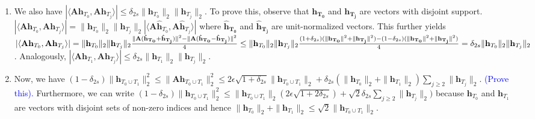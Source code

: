 \documentclass[11pt]{article}
\begin{document}
\begin{enumerate}
\begin{enumerate}
\begin{enumerate}
\textcolor{blue}{
The first inequality follows from the Cauchy-Schwartz inequality. The second inequality can be arrived at using the result of part a and the restricted isometry property of $\mathbf{A}$. 
}
\item We also have $|\langle \mathbf{Ah}_{T_0}, \mathbf{Ah}_{T_j}\rangle| \leq \delta_{2s} \|\mathbf{h}_{T_0}\|_2 \|\mathbf{h}_{T_j}\|_2$. To prove this, observe that $\mathbf{h_{T_0}}$ and $\mathbf{h_{T_j}}$ are vectors with disjoint support. $|\langle \mathbf{Ah}_{T_0}, \mathbf{Ah}_{T_j}\rangle| = \|\mathbf{h}_{T_0}\|_2 \|\mathbf{h}_{T_j}\|_2|\langle \mathbf{A\hat{h}}_{T_0}, \mathbf{A\hat{h}}_{T_j}\rangle|$  where $\mathbf{\hat{h}_{T_0}}$ and $\mathbf{\hat{h}_{T_j}}$ are unit-normalized vectors. This further yields $|\langle \mathbf{Ah}_{T_0}, \mathbf{Ah}_{T_j}\rangle|=\|\mathbf{h}_{T_0}\|_2 \|\mathbf{h}_{T_j}\|_2 \frac{\|\mathbf{A}(\mathbf{\hat{h}_{T_0}}+\mathbf{\hat{h}_{T_j}})\|^2 - \|\mathbf{A}(\mathbf{\hat{h}_{T_0}}-\mathbf{\hat{h}_{T_j}})\|^2}{4} 
\\ \leq \|\mathbf{h}_{T_0}\|_2 \|\mathbf{h}_{T_j}\|_2 \frac{(1+\delta_{2s})(\|\mathbf{h_{T_0}}\|^2+\|\mathbf{h_{T_j}}\|^2)-(1-\delta_{2s})(\|\mathbf{h_{T_0}}\|^2+\|\mathbf{h_{T_j}}\|^2)}{4} \\
= \delta_{2s} \|\mathbf{h}_{T_0}\|_2 \|\mathbf{h}_{T_j}\|_2$. Analogously, $|\langle \mathbf{Ah}_{T_1}, \mathbf{Ah}_{T_j}\rangle| \leq \delta_{2s} \|\mathbf{h}_{T_1}\|_2 \|\mathbf{h}_{T_j}\|_2$. 
\item Now, we have $(1-\delta_{2s})\|\mathbf{h}_{T_0 \cup T_1}\|^2_2 
\leq \|\mathbf{Ah}_{T_0 \cup T_1}\|^2_2 \leq 2 \epsilon \sqrt{1+\delta_{2s}}\|\mathbf{h}_{T_0 \cup T_1}\|_2 + \delta_{2s}(\|\mathbf{h}_{T_0}\|_2 + \|\mathbf{h}_{T_1}\|_2) \sum_{j \geq 2} \|\mathbf{h}_{T_j}\|_2$. \textcolor{blue}{(Prove this).} Furthermore, we can write $(1-\delta_{2s})\|\mathbf{h}_{T_0 \cup T_1}\|^2_2  \leq \|\mathbf{h}_{T_0 \cup T_1}\|_2(2\epsilon\sqrt{1+2\delta_{2s}}) + \sqrt{2}\delta_{2s} \sum_{j \geq 2} \|\mathbf{h}_{T_j}\|_2)$ because $\mathbf{h}_{T_0}$ and $\mathbf{h}_{T_1}$ are vectors with disjoint sets of non-zero indices and hence $\|\mathbf{h}_{T_0}\|_2 + \|\mathbf{h}_{T_1}\|_2 \leq \sqrt{2} \|\mathbf{h}_{T_0 \cup T_1}\|_2$.\\
\textcolor{blue}{
}
\end{enumerate}
\end{enumerate}
\end{enumerate}
\end{document}
